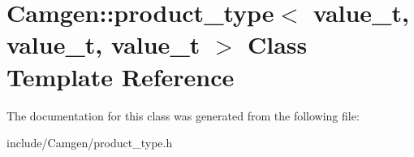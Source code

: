 \hypertarget{a00436}{\section{Camgen\-:\-:product\-\_\-type$<$ value\-\_\-t, value\-\_\-t, value\-\_\-t $>$ Class Template Reference}
\label{a00436}
}


The documentation for this class was generated from the following file\-:\begin{DoxyCompactItemize}
\item 
include/\-Camgen/product\-\_\-type.\-h\end{DoxyCompactItemize}
